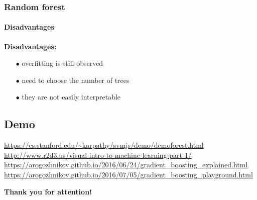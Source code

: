 \begin{frame}
	\frametitle{Random forest}
		\framesubtitle{Disadvantages}

		 \textbf{Disadvantages:}
		\begin{itemize}
		  \item[$\bullet$] overfitting is still observed 
		  \item[$\bullet$] need to choose the number of trees
		  \item[$\bullet$] they are not easily interpretable
		\end{itemize}

\end{frame}

\subsection{Demo} %
\begin{frame}
\bigbreak
\bigbreak
\url{https://cs.stanford.edu/~karpathy/svmjs/demo/demoforest.html}\bigbreak
\url{http://www.r2d3.us/visual-intro-to-machine-learning-part-1/}\bigbreak
\url{https://arogozhnikov.github.io/2016/06/24/gradient_boosting_explained.html}\bigbreak
\url{https://arogozhnikov.github.io/2016/07/05/gradient_boosting_playground.html}
\end{frame}

\begin{frame}
	
	\begin{center}
		\Huge \textbf{Thank you for attention!}
	\end{center}

\end{frame}
